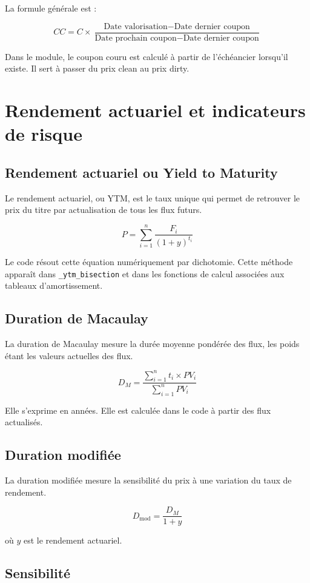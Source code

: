 \documentclass[12pt,a4paper]{article}
\begin{document}
La formule générale est :

\[
CC = C \times
\frac{\text{Date valorisation} - \text{Date dernier coupon}}
{\text{Date prochain coupon} - \text{Date dernier coupon}}
\]

Dans le module, le coupon couru est calculé à partir de l'échéancier lorsqu'il existe. Il sert à passer du prix clean au prix dirty.

\section{Rendement actuariel et indicateurs de risque}

\subsection{Rendement actuariel ou Yield to Maturity}

Le rendement actuariel, ou YTM, est le taux unique qui permet de retrouver le prix du titre par actualisation de tous les flux futurs.

\[
P =
\sum_{i=1}^{n}
\frac{F_i}{(1+y)^{t_i}}
\]

Le code résout cette équation numériquement par dichotomie. Cette méthode apparaît dans \texttt{\_ytm\_bisection} et dans les fonctions de calcul associées aux tableaux d'amortissement.

\subsection{Duration de Macaulay}

La duration de Macaulay mesure la durée moyenne pondérée des flux, les poids étant les valeurs actuelles des flux.

\[
D_M =
\frac{
\sum_{i=1}^{n} t_i \times PV_i
}{
\sum_{i=1}^{n} PV_i
}
\]

Elle s'exprime en années. Elle est calculée dans le code à partir des flux actualisés.

\subsection{Duration modifiée}

La duration modifiée mesure la sensibilité du prix à une variation du taux de rendement.

\[
D_{\text{mod}} =
\frac{D_M}{1+y}
\]

où $y$ est le rendement actuariel.

\subsection{Sensibilité}
\end{document}
